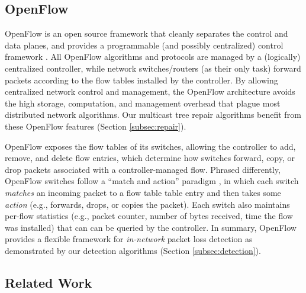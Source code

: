 \subsection{OpenFlow}
\label{subsec:openflow}

OpenFlow is an open source framework that cleanly separates the control and data planes, and provides a programmable (and possibly centralized) control framework \cite{OpenFlow08}.
All OpenFlow algorithms and protocols are managed by a (logically) centralized controller, 
while network switches/routers (as their only task) forward packets according to the flow tables installed by the controller. 
By allowing centralized network control and management, the OpenFlow architecture avoids the high storage, computation, and management overhead that plague most distributed network algorithms.  
Our multicast tree repair algorithms benefit from these OpenFlow features (Section \ref{subsec:repair}).

OpenFlow exposes the flow tables of its switches, allowing the controller to add, remove, and delete flow entries, which determine how switches 
forward, copy, or drop packets associated with a controller-managed flow. 
Phrased differently, OpenFlow switches follow a ``match and action'' paradigm \cite{OpenFlow08}, in which each switch \emph{matches} an incoming packet 
to a flow table table entry and then takes some \emph{action} (e.g., forwards, drops, or copies the packet).
Each switch also maintains per-flow statistics (e.g., packet counter, number of bytes received, time the flow was installed) that can 
can be queried by the controller.  In summary, OpenFlow provides a flexible framework for \emph{in-network} packet loss detection as 
demonstrated by our detection algorithms (Section \ref{subsec:detection}).


\subsection{Related Work}
\label{subsec:related}

